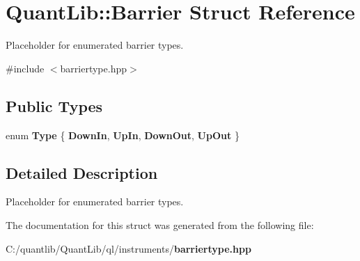 \section{Quant\+Lib\+:\+:Barrier Struct Reference}
\label{struct_quant_lib_1_1_barrier}


Placeholder for enumerated barrier types.  




{\ttfamily \#include $<$barriertype.\+hpp$>$}

\subsection*{Public Types}
\begin{DoxyCompactItemize}
\item 
enum {\bfseries Type} \{ {\bfseries Down\+In}, 
{\bfseries Up\+In}, 
{\bfseries Down\+Out}, 
{\bfseries Up\+Out}
 \}\label{struct_quant_lib_1_1_barrier_a74f1d3a3af3f96c1b79b27e057930afe}

\end{DoxyCompactItemize}


\subsection{Detailed Description}
Placeholder for enumerated barrier types. 

The documentation for this struct was generated from the following file\+:\begin{DoxyCompactItemize}
\item 
C\+:/quantlib/\+Quant\+Lib/ql/instruments/{\bf barriertype.\+hpp}\end{DoxyCompactItemize}
